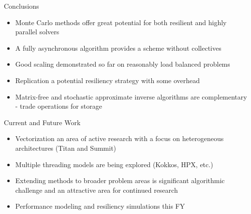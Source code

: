 \documentclass{beamer}
\begin{document}
\begin{frame}{Conclusions}
  \begin{itemize}
  \item Monte Carlo methods offer great potential for both resilient and
    highly parallel solvers
    \vfill
  \item A fully asynchronous algorithm provides a scheme without collectives 
    \vfill
  \item Good scaling demonstrated so far on reasonably load balanced problems
    \vfill
  \item Replication a potential resiliency strategy with some overhead
    \vfill
  \item Matrix-free and stochastic approximate inverse algorithms are
    complementary - trade operations for storage
  \end{itemize}
\end{frame}

\begin{frame}{Current and Future Work}
  \begin{itemize}
  \item Vectorization an area of active research with a focus on heterogeneous
    architectures (Titan and Summit)
    \vfill
  \item Multiple threading models are being explored (Kokkos, HPX, etc.)
    \vfill
  \item Extending methods to broader problem areas is significant algorithmic
    challenge and an attractive area for continued research
    \vfill
  \item Performance modeling and resiliency simulations this FY
  \end{itemize}
\end{frame}

\end{document}
